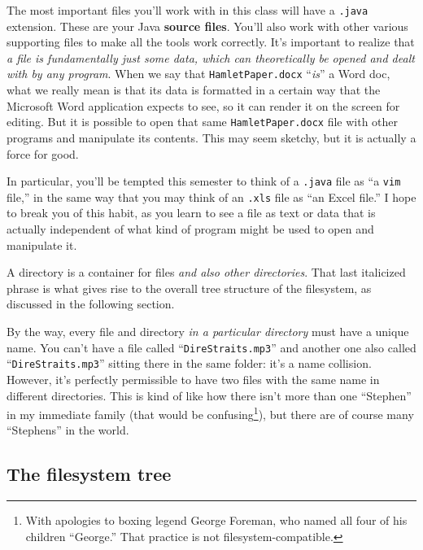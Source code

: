
The most important files you'll work with in this class will have a
\texttt{.java} extension. These are your Java \textbf{source files}. You'll
also work with other various supporting files to make all the tools work
correctly. It's important to realize that \textit{a file is fundamentally just
some data, which can theoretically be opened and dealt with by any program}.
When we say that \texttt{HamletPaper.docx} ``\textit{is}'' a Word doc, what we
really mean is that its data is formatted in a certain way that the Microsoft
Word application expects to see, so it can render it on the screen for editing.
But it is possible to open that same \texttt{HamletPaper.docx} file with other
programs and manipulate its contents. This may seem sketchy, but it is actually
a force for good.

In particular, you'll be tempted this semester to think of a \texttt{.java}
file as ``a \texttt{vim} file,'' in the same way that you may think of an
\texttt{.xls} file as ``an Excel file.'' I hope to break you of this habit, as
you learn to see a file as text or data that is actually independent of what
kind of program might be used to open and manipulate it.

A directory is a container for files \textit{and also other directories}. That
last italicized phrase is what gives rise to the overall tree structure of the
filesystem, as discussed in the following section.

By the way, every file and directory \textit{in a particular directory} must
have a unique name. You can't have a file called ``\texttt{DireStraits.mp3}''
and another one also called ``\texttt{DireStraits.mp3}'' sitting there in the
same folder: it's a name collision. However, it's perfectly permissible to have
two files with the same name in different directories. This is kind of like how
there isn't more than one ``Stephen'' in my immediate family (that would be
confusing\footnote{With apologies to boxing legend George Foreman, who named
all four of his children ``George.'' That practice is not
filesystem-compatible.}), but there are of course many ``Stephens'' in the
world.

\subsection{The filesystem tree}

